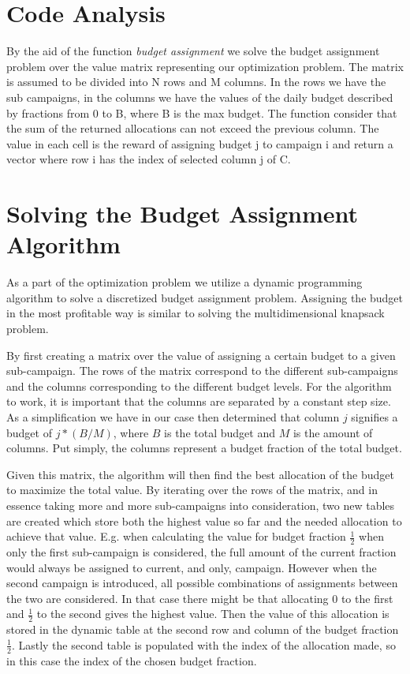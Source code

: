 \section{Code Analysis}
\label{sec:Opt_Code Analysis}

By the aid of the function \textit{budget assignment} we solve the budget assignment problem over the value matrix representing our optimization problem. The matrix is assumed to be divided into N rows and M columns. In the rows we have the sub campaigns, in the columns we have the values of the daily budget described by fractions from 0 to B, where B is the max budget. The function consider that the sum of the returned allocations can not exceed the previous column. The value in each cell is the reward of assigning budget j to campaign i and return a vector where row i has the index of selected column j of C.


\section{Solving the Budget Assignment Algorithm}
\label{sec:budget_assignment_algorithm}

As a part of the optimization problem we utilize a dynamic programming algorithm to solve a discretized budget assignment problem. Assigning the budget in the most profitable way is similar to solving the multidimensional knapsack problem.

By first creating a matrix over the value of assigning a certain budget to a given sub-campaign. The rows of the matrix correspond to the different sub-campaigns and the columns corresponding to the different budget levels. For the algorithm to work, it is important that the columns are separated by a constant step size. As a simplification we have in our case then determined that column $j$ signifies a budget of $j * (B / M)$, where $B$ is the total budget and $M$ is the amount of columns. Put simply, the columns represent a budget fraction of the total budget.

Given this matrix, the algorithm will then find the best allocation of the budget to maximize the total value. By iterating over the rows of the matrix, and in essence taking more and more sub-campaigns into consideration, two new tables are created which store both the highest value so far and the needed allocation to achieve that value. E.g. when calculating the value for budget fraction $\frac{1}{2}$ when only the first sub-campaign is considered, the full amount of the current fraction would always be assigned to current, and only, campaign. However when the second campaign is introduced, all possible combinations of assignments between the two are considered. In that case there might be that allocating $0$ to the first and $\frac{1}{2}$ to the second gives the highest value. Then the value of this allocation is stored in the dynamic table at the second row and column of the budget fraction $\frac{1}{2}$. Lastly the second table is populated with the index of the allocation made, so in this case the index of the chosen budget fraction.


